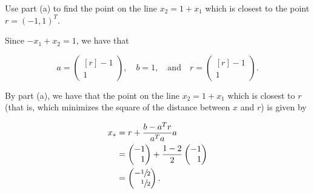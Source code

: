 Use part (a) to find the point on the line $x_2 = 1 + x_1$ which is closest to the point $r = (-1, 1)^T$.

\begin{solution}
    Since $-x_1 + x_2 = 1$, we have that 

    $$
    a = \begin{pmatrix*}[r]
        -1 \\
        1
    \end{pmatrix*}, \quad b = 1, \quad \text{and} \quad r = \begin{pmatrix*}[r]
        -1 \\
        1
    \end{pmatrix*}.
    $$

    By part (a), we have that the point on the line $x_2 = 1 + x_1$ which is closest to $r$ (that is, which minimizes
    the square of the distance between $x$ and $r$) is given by

    \begin{align*}
       x_* &= r + \frac{b - a^T r}{a^T a} a \\
           &= \begin{pmatrix*}[r]
                -1 \\
                 1
              \end{pmatrix*} + \frac{1 - 2}{2} \begin{pmatrix*}[r]
                -1 \\
                 1
              \end{pmatrix*} \\
           &= \begin{pmatrix*}[r]
                -\sfrac{1}{2} \\
                 \sfrac{1}{2}
              \end{pmatrix*}.
    \end{align*}

    \ \\
\end{solution}